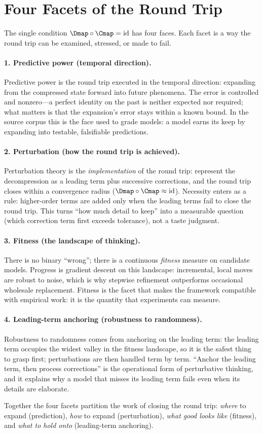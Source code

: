 \section{Four Facets of the Round Trip}
\label{sec:facets}

The single condition $\Dmap\circ\Cmap=\mathrm{id}$ has four faces. Each facet is
a way the round trip can be examined, stressed, or made to fail.

\paragraph{1. Predictive power (temporal direction).}
Predictive power is the round trip executed in the temporal direction: expanding
from the compressed state forward into future phenomena. The error is
controlled and nonzero---a perfect identity on the past is neither expected nor
required; what matters is that the expansion's error stays within a known bound.
In the source corpus this is the face used to grade models: a model earns its
keep by expanding into testable, falsifiable predictions.

\paragraph{2. Perturbation (how the round trip is achieved).}
Perturbation theory is the \emph{implementation} of the round trip: represent
the decompression as a leading term plus successive corrections, and the round
trip closes within a convergence radius ($\Dmap\circ\Cmap\approx\mathrm{id}$).
Necessity enters as a rule: higher-order terms are added only when the leading
terms fail to close the round trip. This turns ``how much detail to keep'' into
a measurable question (which correction term first exceeds tolerance), not a
taste judgment.

\paragraph{3. Fitness (the landscape of thinking).}
There is no binary ``wrong''; there is a continuous \emph{fitness} measure on
candidate models. Progress is gradient descent on this landscape: incremental,
local moves are robust to noise, which is why stepwise refinement outperforms
occasional wholesale replacement. Fitness is the facet that makes the framework
compatible with empirical work: it is the quantity that experiments can measure.

\paragraph{4. Leading-term anchoring (robustness to randomness).}
Robustness to randomness comes from anchoring on the leading term: the leading
term occupies the widest valley in the fitness landscape, so it is the safest
thing to grasp first; perturbations are then handled term by term. ``Anchor the
leading term, then process corrections'' is the operational form of
perturbative thinking, and it explains why a model that misses its leading term
fails even when its details are elaborate.

Together the four facets partition the work of closing the round trip:
\emph{where} to expand (prediction), \emph{how} to expand (perturbation),
\emph{what good looks like} (fitness), and \emph{what to hold onto}
(leading-term anchoring).
